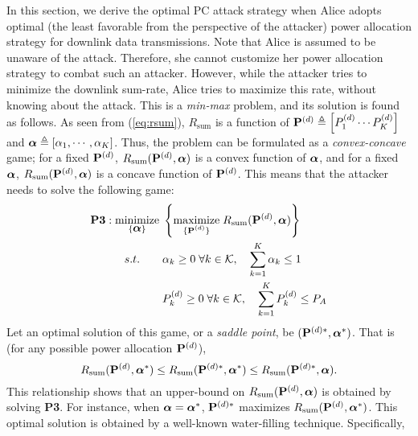 \documentclass[draftclsnofoot, 12pt, onecolumn, journal]{IEEEtran}
\newcommand{\Pm}{{\bf P}}
\newcommand{\alphav}{\hbox{\boldmath$\alpha$}}
\begin{document}
In this section, we derive the optimal PC attack strategy when Alice adopts optimal (the least favorable from the perspective of the attacker) power allocation strategy for downlink data transmissions.
Note that Alice is assumed to be unaware of the attack.
Therefore, she cannot customize her power allocation strategy to combat such an attacker.
However, while the attacker tries to minimize the downlink sum-rate, Alice tries to maximize this rate, without knowing about the attack.
This is a \textit{min-max} problem, and its solution is found as follows.  
As seen from (\ref{eq:rsum}), $R_{\text{sum}}$ is a function of $ \Pm^{(d)} \triangleq \left[ P_1^{(d)} \cdots P_K^{(d)} \right]$ and $\alphav \triangleq [\alpha_1, \cdots, \alpha_K]$.
Thus, the problem can be formulated as a \textit{convex-concave} game; for a fixed $\Pm^{(d)}$, $R_{\text{sum}}(\Pm^{(d)}, \alphav)$ is a convex function of $\alphav$, and for a fixed $\alphav$, $R_{\text{sum}}(\Pm^{(d)}, \alphav)$ is a concave function of $\Pm^{(d)}$.
This means that the attacker needs to solve the following game:
%
\begin{align}
\textbf{P3}:
 \underset{ 
\begin{subarray} \\
\{\alphav \} \end{subarray} }{\text{minimize}} \;
& \left\lbrace \underset{ 
\begin{subarray} \\
\{ \Pm^{(d)}  \} \end{subarray} }{\text{maximize}} \;
 R_{\text{sum}}(\Pm^{(d)}, \alphav) \right\rbrace \nonumber  \\
 s.t. \quad \quad & \alpha_k \geq 0   \; \forall k \in \mathcal{K}, \quad \sum_{k = 1}^K \alpha_k \leq 1 \nonumber \\
&  P_k^{(d)} \geq 0   \; \forall k \in \mathcal{K}, \quad \sum_{k = 1}^K  P_k^{(d)} \leq P_A \nonumber 
\end{align}
%
Let an optimal solution of this game, or a \textit{saddle point}, be $(\Pm^{(d)*}, \alphav^*)$.
That is (for any possible power allocation $\Pm^{(d)}$),
$$ R_{\text{sum}}(\Pm^{(d)}, \alphav^*) \leq R_{\text{sum}}(\Pm^{(d)*}, \alphav^*) \leq R_{\text{sum}}(\Pm^{(d)*}, \alphav).$$
This relationship shows that an upper-bound on $R_{\text{sum}}(\Pm^{(d)}, \alphav)$ is obtained by solving \textbf{P3}.
For instance, when $\alphav = \alphav^*$, $\Pm^{(d)*}$ maximizes $R_{\text{sum}}(\Pm^{(d)}, \alphav^*)$.
This optimal solution is obtained by a well-known water-filling technique.
Specifically,
\end{document}
